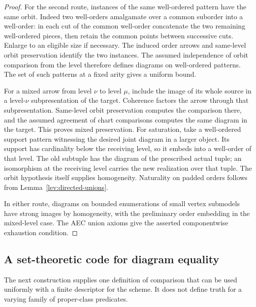 \begin{proof}
For the second route, instances of the same well-ordered pattern
have the same orbit.  Indeed two well-orders amalgamate over a common
suborder into a well-order: in each cut of the common well-order
concatenate the two remaining well-ordered pieces, then retain the
common points between successive cuts.  Enlarge to an eligible size
if necessary.  The induced order arrows and same-level orbit
preservation identify the two instances.  The assumed independence
of orbit comparison from the level therefore defines diagrams on
well-ordered patterns.  The set of such patterns at a fixed arity
gives a uniform bound.

For a mixed arrow from level $\nu$ to level $\mu$, include the image
of its whole source in a level-$\nu$ subpresentation of the target.
Coherence factors the arrow through that subpresentation.  Same-level
orbit preservation computes the comparison there, and the assumed
agreement of chart comparisons computes the same diagram in the
target.  This proves mixed preservation.  For saturation, take a
well-ordered support pattern witnessing the desired joint diagram
in a larger object.  Its support has cardinality below the receiving
level, so it embeds into a well-order of that level.  The old subtuple
has the diagram of the prescribed actual tuple; an isomorphism at
the receiving level carries the new realization over that tuple.
The orbit hypothesis itself supplies homogeneity.  Naturality on
padded orders follows from Lemma~\ref{lev:directed-unions}.

In either route, diagrams on bounded enumerations of small vertex
submodels have strong images by homogeneity, with the preliminary
order embedding in the mixed-level case.  The AEC union axioms give
the asserted componentwise exhaustion condition.
\end{proof}

\subsection{A set-theoretic code for diagram equality}

The next construction supplies one definition of comparison that can
be used uniformly with a finite descriptor for the scheme.  It does
not define truth for a varying family of proper-class predicates.

